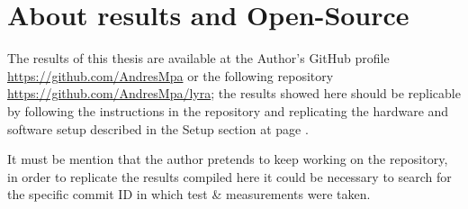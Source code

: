 \chapter{About results and Open-Source}
\label{apendice:lyra}

The results of this thesis are available at the Author's GitHub profile \url{https://github.com/AndresMpa} or the following repository \url{https://github.com/AndresMpa/lyra}; the results showed here should be replicable by following the instructions in the repository and replicating the hardware and software setup described in the Setup section at page \pageref{sec:setup}.

It must be mention that the author pretends to keep working on the repository, in order to replicate the results compiled here it could be necessary to search for the specific commit ID in which test \& measurements were taken.
